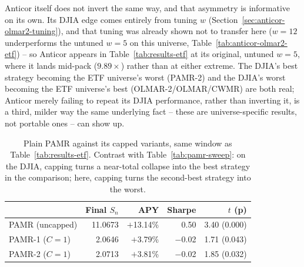\documentclass[11pt]{article}
\begin{document}
Anticor itself does not invert the same way, and that asymmetry is
informative on its own. Its DJIA edge comes entirely from tuning $w$
(Section~\ref{sec:anticor-olmar2-tuning}), and that tuning was already
shown not to transfer here ($w=12$ underperforms the untuned $w=5$ on
this universe, Table~\ref{tab:anticor-olmar2-etf}) -- so Anticor
appears in Table~\ref{tab:results-etf} at its original, untuned $w=5$,
where it lands mid-pack ($9.89\times$) rather than at either extreme.
The DJIA's best strategy becoming the ETF universe's worst (PAMR-2) and
the DJIA's worst becoming the ETF universe's best (OLMAR-2/OLMAR/CWMR)
are both real; Anticor merely failing to repeat its DJIA performance,
rather than inverting it, is a third, milder way the same underlying
fact -- these are universe-specific results, not portable ones -- can
show up.

\begin{table}[h]
\centering
\begin{tabular}{lrrrr}
\toprule
& Final $S_n$ & APY & Sharpe & $t$ (p) \\
\midrule
PAMR (uncapped) & 11.0673 & $+$13.14\% & 0.50    & 3.40 (0.000) \\
PAMR-1 ($C{=}1$) &  2.0646 & $+$3.79\%  & $-$0.02 & 1.71 (0.043) \\
PAMR-2 ($C{=}1$) &  2.0713 & $+$3.81\%  & $-$0.02 & 1.85 (0.032) \\
\bottomrule
\end{tabular}
\caption{Plain PAMR against its capped variants, same window as
Table~\ref{tab:results-etf}. Contrast with Table~\ref{tab:pamr-sweep}:
on the DJIA, capping turns a near-total collapse into the best strategy
in the comparison; here, capping turns the second-best strategy into the
worst.}
\label{tab:etf-pamr}
\end{table}
\end{document}

